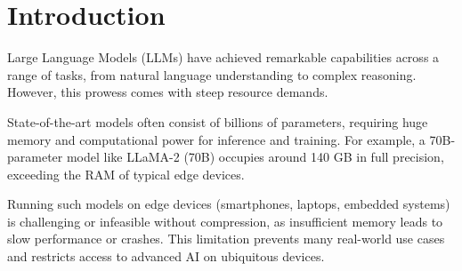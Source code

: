 \chapter{Introduction}
Large Language Models (LLMs) have achieved remarkable capabilities across a range of tasks, from natural language understanding to complex reasoning. However, this prowess comes with steep resource demands.

State-of-the-art models often consist of billions of parameters, requiring huge memory and computational power for inference and training. For example, a 70B-parameter model like LLaMA-2 (70B) occupies around 140 GB in full precision, exceeding the RAM of typical edge devices. 

Running such models on edge devices (smartphones, laptops, embedded systems) is challenging or infeasible without compression, as insufficient memory leads to slow performance or crashes. This limitation prevents many real-world use cases and restricts access to advanced AI on ubiquitous devices.






% 
